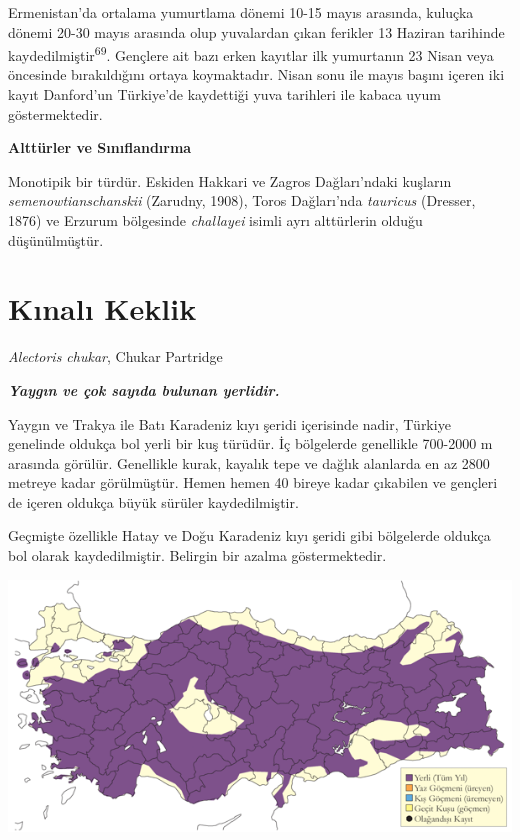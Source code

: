 \documentclass[
  letterpaper,
  DIV=11,
  numbers=noendperiod]{scrreprt}
\begin{document}
Ermenistan'da ortalama yumurtlama dönemi 10-15 mayıs arasında, kuluçka
dönemi 20-30 mayıs arasında olup yuvalardan çıkan ferikler 13 Haziran
tarihinde kaydedilmiştir\textsuperscript{69}. Gençlere ait bazı erken
kayıtlar ilk yumurtanın 23 Nisan veya öncesinde bırakıldığını ortaya
koymaktadır. Nisan sonu ile mayıs başını içeren iki kayıt Danford'un
Türkiye'de kaydettiği yuva tarihleri ile kabaca uyum göstermektedir.

\textbf{Alttürler ve Sınıflandırma}

Monotipik bir türdür. Eskiden Hakkari ve Zagros Dağları'ndaki kuşların
\emph{semenowtianschanskii} (Zarudny, 1908), Toros Dağları'nda
\emph{tauricus} (Dresser, 1876) ve Erzurum bölgesinde \emph{challayei}
isimli ayrı alttürlerin olduğu düşünülmüştür.

\hypertarget{kux131nalux131-keklik}{%
\section{Kınalı Keklik}\label{kux131nalux131-keklik}}

\emph{Alectoris chukar}, Chukar Partridge

\textbf{\emph{Yaygın ve çok sayıda bulunan yerlidir.}}

Yaygın ve Trakya ile Batı Karadeniz kıyı şeridi içerisinde nadir,
Türkiye genelinde oldukça bol yerli bir kuş türüdür. İç bölgelerde
genellikle 700-2000 m arasında görülür. Genellikle kurak, kayalık tepe
ve dağlık alanlarda en az 2800 metreye kadar görülmüştür. Hemen hemen 40
bireye kadar çıkabilen ve gençleri de içeren oldukça büyük sürüler
kaydedilmiştir.

Geçmişte özellikle Hatay ve Doğu Karadeniz kıyı şeridi gibi bölgelerde
oldukça bol olarak kaydedilmiştir. Belirgin bir azalma göstermektedir.

\includegraphics{images/harita_Page_039.png}
\end{document}
